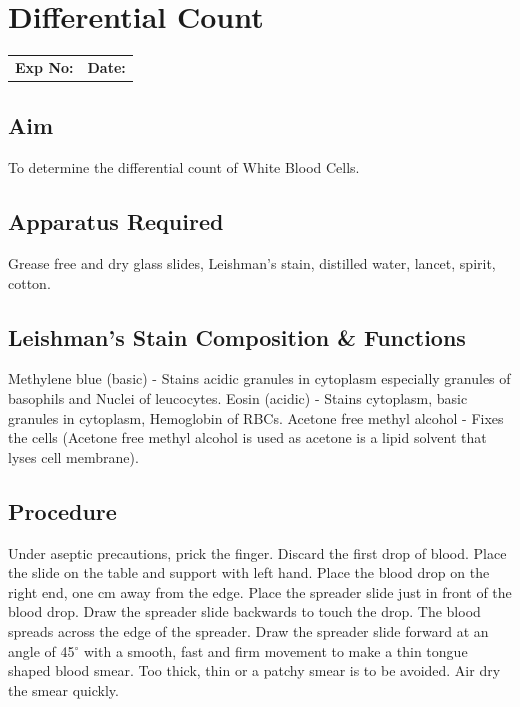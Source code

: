 \documentclass[a4paper,12pt,openany,twoside]{book}
\begin{document}
					\chapter*{\centering Differential Count}
					\begin{tabular}{p{5in} p{1in}}
						\textbf{Exp No:}  & \textbf{Date:}\\
					\end{tabular}

					\section*{Aim}
					To determine the differential count of White Blood Cells.
					\section*{Apparatus Required}
					Grease free and dry glass slides, Leishman’s stain, distilled water, lancet, spirit, cotton.	
					\section*{Leishman's Stain Composition \& Functions}
					Methylene blue (basic) 	     -	Stains acidic granules in cytoplasm especially 						granules of basophils and Nuclei of leucocytes.\newline
					Eosin (acidic) 		     -	Stains cytoplasm, basic granules in 							cytoplasm, Hemoglobin of RBCs.\newline
					Acetone free methyl alcohol - 	Fixes the cells (Acetone free methyl alcohol 						is used as acetone is a lipid solvent that 		lyses cell membrane).

					\section*{Procedure}

						Under aseptic precautions, prick the finger. Discard the first drop of blood. Place the slide on the table and support with left hand. Place the blood drop on the right end, one cm away from the edge. Place the spreader slide just in front of the blood drop. Draw the spreader slide backwards to touch the drop. The blood spreads across the edge of the spreader. Draw the spreader slide forward at an angle of 45$^{\circ}$ with a smooth, fast and firm movement to make a thin tongue shaped blood smear. Too thick, thin or a patchy smear is to be avoided. Air dry the smear quickly.
\end{document}
